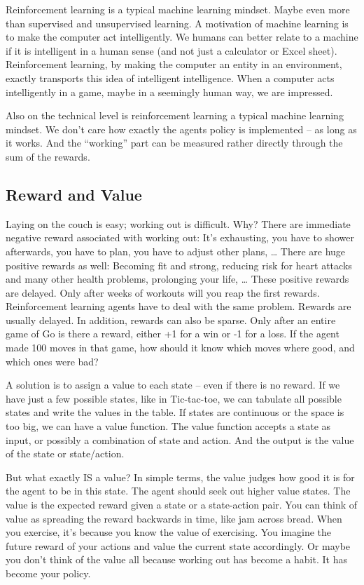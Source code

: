 \documentclass[
  10pt,
]{scrbook}
\begin{document}
Reinforcement learning is a typical machine learning mindset.
Maybe even more than supervised and unsupervised learning.
A motivation of machine learning is to make the computer act intelligently.
We humans can better relate to a machine if it is intelligent in a human sense (and not just a calculator or Excel sheet).
Reinforcement learning, by making the computer an entity in an environment, exactly transports this idea of intelligent intelligence.
When a computer acts intelligently in a game, maybe in a seemingly human way, we are impressed.

Also on the technical level is reinforcement learning a typical machine learning mindset.
We don't care how exactly the agents policy is implemented -- as long as it works.
And the ``working'' part can be measured rather directly through the sum of the rewards.

\hypertarget{reward-and-value}{%
\subsection{Reward and Value}\label{reward-and-value}}

Laying on the couch is easy; working out is difficult.
Why?
There are immediate negative reward associated with working out:
It's exhausting, you have to shower afterwards, you have to plan, you have to adjust other plans, \ldots{}
There are huge positive rewards as well:
Becoming fit and strong, reducing risk for heart attacks and many other health problems, prolonging your life, \ldots{}
These positive rewards are delayed.
Only after weeks of workouts will you reap the first rewards.
Reinforcement learning agents have to deal with the same problem.
Rewards are usually delayed.
In addition, rewards can also be sparse.
Only after an entire game of Go is there a reward, either +1 for a win or -1 for a loss.
If the agent made 100 moves in that game, how should it know which moves where good, and which ones were bad?

A solution is to assign a value to each state -- even if there is no reward.
If we have just a few possible states, like in Tic-tac-toe, we can tabulate all possible states and write the values in the table.
If states are continuous or the space is too big, we can have a value function.
The value function accepts a state as input, or possibly a combination of state and action.
And the output is the value of the state or state/action.

But what exactly IS a value?
In simple terms, the value judges how good it is for the agent to be in this state.
The agent should seek out higher value states.
The value is the expected reward given a state or a state-action pair.
You can think of value as spreading the reward backwards in time, like jam across bread.
When you exercise, it's because you know the value of exercising.
You imagine the future reward of your actions and value the current state accordingly.
Or maybe you don't think of the value all because working out has become a habit.
It has become your policy.
\end{document}
